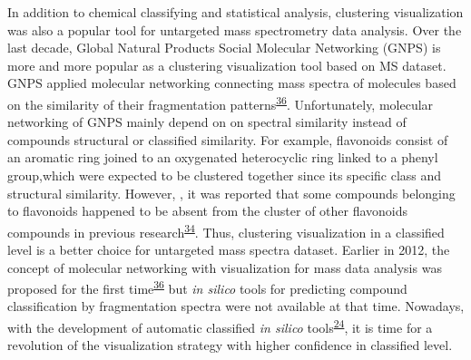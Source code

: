 \documentclass[
]{article}
\begin{document}
In addition to chemical classifying and statistical analysis, clustering
visualization was also a popular tool for untargeted mass spectrometry
data analysis. Over the last decade, Global Natural Products Social
Molecular Networking (GNPS) is more and more popular as a clustering
visualization tool based on MS dataset. GNPS applied molecular
networking connecting mass spectra of molecules based on the similarity
of their fragmentation
patterns\textsuperscript{\protect\hyperlink{ref-2012a}{36}}.
Unfortunately, molecular networking of GNPS mainly depend on on spectral
similarity instead of compounds structural or classified similarity. For
example, flavonoids consist of an aromatic ring joined to an oxygenated
heterocyclic ring linked to a phenyl group,which were expected to be
clustered together since its specific class and structural similarity.
However, , it was reported that some compounds belonging to flavonoids
happened to be absent from the cluster of other flavonoids compounds in
previous
research\textsuperscript{\protect\hyperlink{ref-duhrkop_systematic_2021}{34}}.
Thus, clustering visualization in a classified level is a better choice
for untargeted mass spectra dataset. Earlier in 2012, the concept of
molecular networking with visualization for mass data analysis was
proposed for the first
time\textsuperscript{\protect\hyperlink{ref-2012a}{36}} but \emph{in
silico} tools for predicting compound classification by fragmentation
spectra were not available at that time. Nowadays, with the development
of automatic classified \emph{in silico}
tools\textsuperscript{\protect\hyperlink{ref-2016}{24}}, it is time for
a revolution of the visualization strategy with higher confidence in
classified level.
\end{document}

